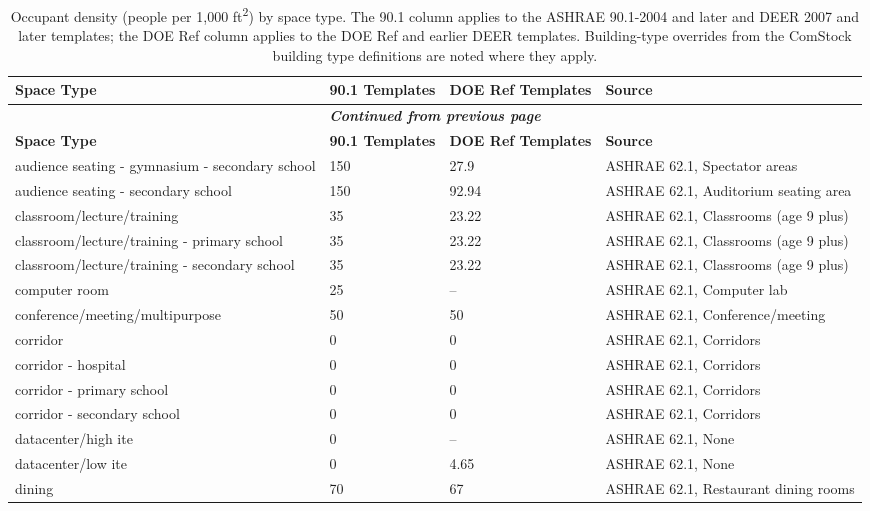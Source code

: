 \begin{center}
\scriptsize
\begin{longtable}{|p{2.1in}|p{0.85in}|p{0.85in}|p{2.5in}|}
\caption[Occupant Density by Space Type]{Occupant density (people per 1,000 ft\textsuperscript{2}) by space type. The 90.1 column applies to the ASHRAE 90.1-2004 and later and DEER 2007 and later templates; the DOE Ref column applies to the DOE Ref and earlier DEER templates. Building-type overrides from the ComStock building type definitions are noted where they apply.} \\ \hline
\label{tab:occupancy_density_all}
\textbf{Space Type} & \textbf{90.1 Templates} & \textbf{DOE Ref Templates} & \textbf{Source} \\ \hline
\endfirsthead
\multicolumn{4}{c}{{\bfseries \textit{Continued from previous page}}} \\ \hline
\textbf{Space Type} & \textbf{90.1 Templates} & \textbf{DOE Ref Templates} & \textbf{Source} \\ \hline
\endhead
audience seating - gymnasium - secondary school & 150 & 27.9 & ASHRAE 62.1, Spectator areas \\ \hline
audience seating - secondary school & 150 & 92.94 & ASHRAE 62.1, Auditorium seating area \\ \hline
classroom/lecture/training & 35 & 23.22 & ASHRAE 62.1, Classrooms (age 9 plus) \\ \hline
classroom/lecture/training - primary school & 35 & 23.22 & ASHRAE 62.1, Classrooms (age 9 plus) \\ \hline
classroom/lecture/training - secondary school & 35 & 23.22 & ASHRAE 62.1, Classrooms (age 9 plus) \\ \hline
computer room & 25 & -- & ASHRAE 62.1, Computer lab \\ \hline
conference/meeting/multipurpose & 50 & 50 & ASHRAE 62.1, Conference/meeting \\ \hline
corridor & 0 & 0 & ASHRAE 62.1, Corridors \\ \hline
corridor - hospital & 0 & 0 & ASHRAE 62.1, Corridors \\ \hline
corridor - primary school & 0 & 0 & ASHRAE 62.1, Corridors \\ \hline
corridor - secondary school & 0 & 0 & ASHRAE 62.1, Corridors \\ \hline
datacenter/high ite & 0 & -- & ASHRAE 62.1, None \\ \hline
datacenter/low ite & 0 & 4.65 & ASHRAE 62.1, None \\ \hline
dining & 70 & 67 & ASHRAE 62.1, Restaurant dining rooms \\ \hline

\end{longtable}
\end{center}

